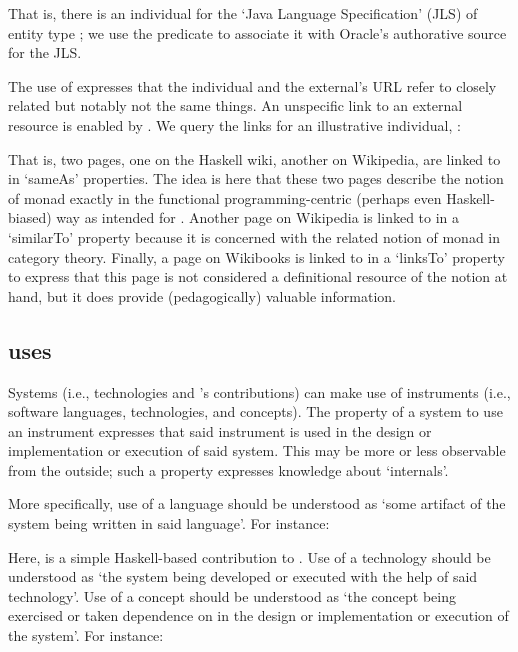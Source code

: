 \noindent
That is, there is an \solasote{} individual for the `Java Language
Specification' (JLS) of entity type ; we use the
 predicate to associate it with Oracle's authorative
source for the JLS.

The use of  expresses that the \solasote{}
individual and the external's URL refer to closely related but notably
not the same things. An unspecific link to an external resource is
enabled by . We query the links for an illustrative
individual, :



\noindent
That is, two pages, one on the Haskell wiki, another on Wikipedia, are
linked to in `sameAs' properties. The idea is here that these two
pages describe the notion of monad exactly in the functional
programming-centric (perhaps even Haskell-biased) way as intended for
\solasote. Another page on Wikipedia is linked to in a `similarTo'
property because it is concerned with the related notion of monad in
category theory. Finally, a page on Wikibooks is linked to in a
`linksTo' property to express that this page is not considered a
definitional resource of the notion at hand, but it does provide
(pedagogically) valuable information.


\subsection{uses} 
\label{S:uses}

Systems (i.e., technologies and \ooo{}'s contributions) can make use
of instruments (i.e., software languages, technologies, and
concepts). The property of a system to use an instrument expresses
that said instrument is used in the design or implementation or
execution of said system. This may be more or less observable from the
outside; such a property expresses knowledge about `internals'.

More specifically, use of a language should be understood as `some
artifact of the system being written in said language'. For instance:


\noindent
Here,  is a simple Haskell-based contribution
to \ooo{}. Use of a technology should be understood as `the system
being developed or executed with the help of said technology'. Use of
a concept should be understood as `the concept being exercised or
taken dependence on in the design or implementation or execution of
the system'. For instance:

